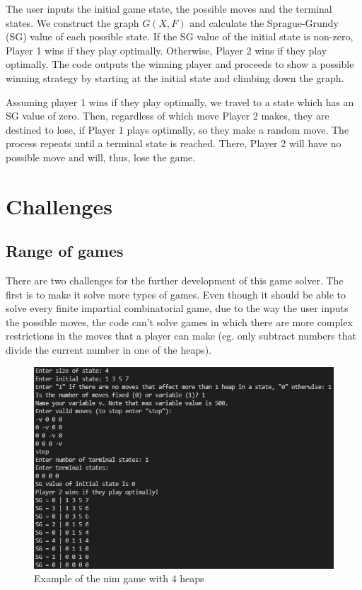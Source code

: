 \documentclass{article}
\begin{document}
The user inputs the initial game state, the possible moves and the terminal states. We construct the graph $G(X, F)$ and calculate the Sprague-Grundy (SG) value of each possible state. If the SG value of the initial state is non-zero, Player 1 wins if they play optimally. Otherwise, Player 2 wins if they play optimally. The code outputs the winning player and proceeds to show a possible winning strategy by starting at the initial state and climbing down the graph.

Assuming player 1 wins if they play optimally, we travel to a state which has an SG value of zero. Then, regardless of which move Player 2 makes, they are destined to lose, if Player 1 plays optimally, so they make a random move. The process repeats until a terminal state is reached. There, Player 2 will have no possible move and will, thus, lose the game. 

\section{Challenges}

\subsection{Range of games}

There are two challenges for the further development of this game solver. The first is to make it solve more types of games. Even though it should be able to solve every finite impartial combinatorial game, due to the way the user inputs the possible moves, the code can't solve games in which there are more complex restrictions in the moves that a player can make (eg. only subtract numbers that divide the current number in one of the heaps).
\begin{figure}[H]
\centering
\includegraphics[scale=0.75]{nim}
\caption{Example of the nim game with 4 heaps}
\label{fig:nim}
\end{figure}
\end{document}
